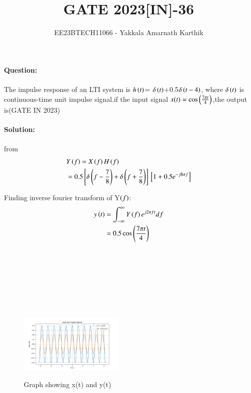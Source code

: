 \documentclass[journal,12pt,twocolumn]{IEEEtran}
\begin{document}


\title{GATE 2023[IN]-36}
\author{EE23BTECH11066 - Yakkala Amarnath Karthik}
\maketitle

\textbf{Question:}\\ \\
The impulse response of an LTI system is $h\left(t\right)$= $\delta\left(t\right)$+0.5$ \delta\left(t-4\right)$, where $\delta\left(t\right)$ is continuous-time unit impulse signal.if the input signal $x(t)=\cos\left(\frac{7\pi t}{4}\right)$,the output is\hfill(GATE IN 2023)\\ \\

\textbf{Solution:}\\
\\
from 
\begin{align}
    &Y\left(f\right) = X\left(f\right)H\left(f\right)\\
   &=0.5{}\left[\delta \left(f-\frac{7}{8}\right)+\delta \left(f+\frac{7}{8}\right)\right]{}\left[1+0.5e^{-j8\pi f}\right]
\end{align}

Finding inverse fourier transform of Y$\left(f\right)$:
\begin{align}
    y\left(t\right)&=\int_{-\infty}^{\infty}Y\left(f\right)e^{j2\pi ft}df\\
    &=0.5\cos\left({\frac{7\pi t}{4}}\right)
\end{align}


  \begin{figure}[ht]
        \hspace{3cm} \\ \\ \\ \\ \\ \\ \\ \includegraphics[width=0.45\textwidth]{figs/pythongate.png}
        \caption{Graph showing x(t) and y(t)}
    \end{figure} 
\end{document}
